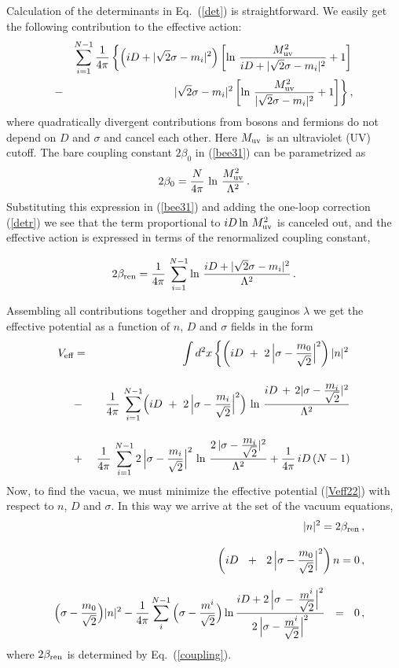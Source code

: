 \documentclass[epsfig,12pt]{article}
\def\beq{\begin{equation}}
\def\eeq{\end{equation}}
\def\beqn{\begin{eqnarray}}
\def\eeqn{\end{eqnarray}}
\def\beqn{\begin{eqnarray}}
\def\eeqn{\end{eqnarray}}
\def\beq{\begin{equation}}
\def\eeq{\end{equation}}
\begin{document}
Calculation of the determinants in Eq.~(\ref{det}) 
is straightforward. We easily get the following contribution to the
effective action:
\beqn
&&\sum_{i=1}^{N-1}\frac{1}{4\pi}\left\{\left(iD
+|\sqrt{2}\sigma-m_i|^2\right)
\left[\ln\, {\frac{M_{\rm uv}^2}{iD
+|\sqrt{2}\sigma-m_i|^2}}+1\right]
\right.
\nonumber\\
&-&
\left. 
|\sqrt{2}\sigma-m_i|^2
\left[\ln\, {\frac{M_{\rm uv}^2}{
|\sqrt{2}\sigma-m_i|^2}}+1\right]
\right\},
\label{detr}
\eeqn
where quadratically divergent contributions from bosons and fermions do
not depend on
$D$ and $\sigma$ and cancel each other. Here $M_{\rm uv}$ is an ultraviolet (UV) cutoff.
 The bare coupling constant
 $2\beta_0$ in (\ref{bee31}) can be parametrized as
\beq
2\beta_0=\frac{N}{4\pi}\, \ln\, {\frac{M_{\rm uv}^2}{\Lambda^2}}\,.
\eeq
Substituting this expression in (\ref{bee31}) and adding 
the one-loop correction
(\ref{detr})
we see that the term proportional to 
$iD \ln\, {M_{\rm uv}^2}$ is canceled out, and the effective action is
expressed in terms of the renormalized coupling constant,
\beq
\rule{0mm}{8mm}
2\beta_{\rm ren}=\frac{1}{4\pi}\, 
\sum_{i=1}^{N-1}\ln\, {\frac{iD +|\sqrt{2}\sigma-m_i|^2}{\Lambda^2}}\, .
\label{coupling}
\eeq

\vspace{2mm}

Assembling  all contributions together and dropping gauginos $\lambda$ we get the effective potential as 
a function of $n$, $D$ and $\sigma$ fields  in
the form
\beqn
	V_\text{eff} & =& \int d^2x 
		\left\{  \left( iD ~+~ 2\,\Bigl|\sigma - \frac{m_0}{\sqrt{2}}\Bigr|^2 \right) |n|^2 \right.
	\nonumber\\[4mm]
	&-& 
	\frac{1}{4\pi}\, \sum_{i=1}^{N-1} \Bigl( iD ~+~ 2\,\Bigl|\sigma - \frac{m_i}{\sqrt{2}}\Bigr|^2 \Bigr)\,
		\ln\, \frac{ iD \,+\, 2 | \sigma - \frac{\displaystyle m_i}{\displaystyle \sqrt{2}} |^2} {\Lambda^2}
\nonumber\\[4mm]
	&+& 
	\frac{1}{4\pi}\, \sum_{i=1}^{N-1} 2\,\Bigl|\sigma - \frac{m_i}{\sqrt{2}}\Bigr|^2\,
			\ln\, \frac{ 2\, | \sigma - \frac{\displaystyle m_i}{\displaystyle \sqrt{2}} |^2 }
 { \Lambda^2 }
	+
	\frac{1}{4\pi}\, iD\, (N-1)  \Biggr .
	\nonumber\\
	\label{Veff22}
\eeqn
Now, to find the vacua, we must minimize the 
effective potential (\ref{Veff22}) with respect to $n$, $D$ and $ \sigma $. In this way we  arrive at
the set of	the vacuum equations,
\beqn
\label{22eff1}
	&&
	|n|^2  = 2\beta_{\rm ren}\,, 
\\[3mm]				
	&&
	\left( i D ~~+~~ 2\,\Bigl|\sigma - \frac{m_0}{\sqrt{2}}\Bigr|^2 \right) n = 0\,, 
	\label{22eff2}
	\\[3mm]
	&&
	\Bigl(\sigma - \frac{m_0}{\sqrt{2}}\Bigr)|n|^2 
		-
	\frac{1}{4\pi} \sum_i^{N-1}\,
			\Bigl(\sigma - \frac{m^i}{\sqrt{2}}\Bigr)\,
		{\rm ln}\, 
		\frac{i D + 2\, \Bigl| \sigma \,-\, \frac{\displaystyle m^i}{\displaystyle \sqrt{2}} \Bigr|^2}
		{2\, \Bigl| \sigma - \frac{\displaystyle m^i}{\displaystyle \sqrt{2}} \Bigr|^2}
		 ~~=~~ 0\,,
\label{22eff3}
\nonumber\\
\eeqn
where $2\beta_{\rm ren}$ is determined by Eq.~(\ref{coupling}).
\end{document}
